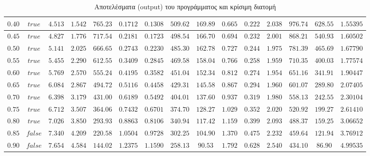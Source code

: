 \begin{landscape}
\begin{table}[H]
\begin{tabular}{| c | c | c | c | c | c | c | c | c | c | c | c | c | c | c |}
\hline
$0.40$ & $true$ & $4.513$ & $1.542$ & $765.23$ & $0.1712$ & $0.1308$ & $509.62$ & $169.89$ & $0.665$ & $0.222$ & $2.038$ & $976.74$ & $628.55$ & $1.55395$ \\
\hline
$0.45$ & $true$ & $4.827$ & $1.776$ & $717.54$ & $0.2181$ & $0.1723$ & $498.54$ & $166.70$ & $0.694$ & $0.232$ & $2.001$ & $868.21$ & $540.93$ & $1.60502$ \\
\hline
$0.50$ & $true$ & $5.141$ & $2.025$ & $666.65$ & $0.2743$ & $0.2230$ & $485.30$ & $162.78$ & $0.727$ & $0.244$ & $1.975$ & $781.39$ & $465.69$ & $1.67790$ \\
\hline
$0.55$ & $true$ & $5.455$ & $2.290$ & $612.55$ & $0.3409$ & $0.2845$ & $469.58$ & $158.04$ & $0.766$ & $0.258$ & $1.959$ & $710.35$ & $400.03$ & $1.77574$ \\
\hline
$0.60$ & $true$ & $5.769$ & $2.570$ & $555.24$ & $0.4195$ & $0.3582$ & $451.04$ & $152.34$ & $0.812$ & $0.274$ & $1.954$ & $651.16$ & $341.91$ & $1.90447$ \\
\hline
$0.65$ & $true$ & $6.084$ & $2.867$ & $494.72$ & $0.5116$ & $0.4458$ & $429.31$ & $145.58$ & $0.867$ & $0.294$ & $1.960$ & $601.07$ & $289.80$ & $2.07405$ \\
\hline
$0.70$ & $true$ & $6.398$ & $3.179$ & $431.00$ & $0.6189$ & $0.5492$ & $404.01$ & $137.60$ & $0.937$ & $0.319$ & $1.980$ & $558.13$ & $242.55$ & $2.30104$ \\
\hline
$0.75$ & $true$ & $6.712$ & $3.507$ & $364.06$ & $0.7432$ & $0.6701$ & $374.70$ & $128.27$ & $1.029$ & $0.352$ & $2.020$ & $520.92$ & $199.27$ & $2.61410$ \\
\hline
$0.80$ & $true$ & $7.026$ & $3.850$ & $293.93$ & $0.8863$ & $0.8106$ & $340.94$ & $117.42$ & $1.159$ & $0.399$ & $2.093$ & $488.37$ & $159.25$ & $3.06652$ \\
\hline
$0.85$ & $false$ & $7.340$ & $4.209$ & $220.58$ & $1.0504$ & $0.9728$ & $302.25$ & $104.90$ & $1.370$ & $0.475$ & $2.232$ & $459.64$ & $121.94$ & $3.76912$ \\
\hline
$0.90$ & $false$ & $7.654$ & $4.584$ & $144.02$ & $1.2375$ & $1.1590$ & $258.13$ & $90.53$ & $1.792$ & $0.628$ & $2.540$ & $434.10$ & $86.90$ & $4.99535$ \\
\hline
\end{tabular}
\caption{Αποτελέσματα (\textlatin{output}) του προγράμματος και κρίσιμη διατομή}
\label{tab:results}
\end{table}
\end{landscape}